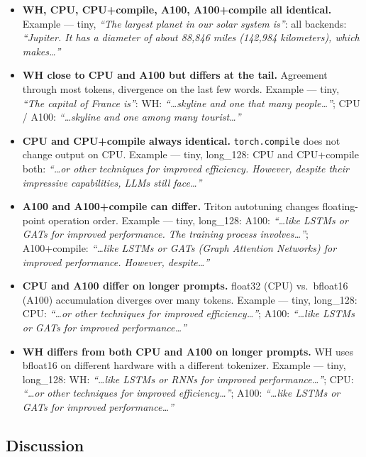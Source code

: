 \begin{itemize}
  \item \textbf{WH, CPU, CPU+compile, A100, A100+compile all identical.} Example — tiny, \textit{``The largest planet in our solar system is''}: all backends: \textit{``Jupiter. It has a diameter of about 88,846 miles (142,984 kilometers), which makes\ldots''}

  \item \textbf{WH close to CPU and A100 but differs at the tail.} Agreement through most tokens, divergence on the last few words. Example — tiny, \textit{``The capital of France is''}: WH: \textit{``\ldots skyline and one that many people\ldots''}; CPU / A100: \textit{``\ldots skyline and one among many tourist\ldots''}

  \item \textbf{CPU and CPU+compile always identical.} \texttt{torch.compile} does not change output on CPU. Example — tiny, long\_128: CPU and CPU+compile both: \textit{``\ldots or other techniques for improved efficiency. However, despite their impressive capabilities, LLMs still face\ldots''}

  \item \textbf{A100 and A100+compile can differ.} Triton autotuning changes floating-point operation order. Example — tiny, long\_128: A100: \textit{``\ldots like LSTMs or GATs for improved performance. The training process involves\ldots''}; A100+compile: \textit{``\ldots like LSTMs or GATs (Graph Attention Networks) for improved performance. However, despite\ldots''}

  \item \textbf{CPU and A100 differ on longer prompts.} float32 (CPU) vs.\ bfloat16 (A100) accumulation diverges over many tokens. Example — tiny, long\_128: CPU: \textit{``\ldots or other techniques for improved efficiency\ldots''}; A100: \textit{``\ldots like LSTMs or GATs for improved performance\ldots''}

  \item \textbf{WH differs from both CPU and A100 on longer prompts.} WH uses bfloat16 on different hardware with a different tokenizer. Example — tiny, long\_128: WH: \textit{``\ldots like LSTMs or RNNs for improved performance\ldots''}; CPU: \textit{``\ldots or other techniques for improved efficiency\ldots''}; A100: \textit{``\ldots like LSTMs or GATs for improved performance\ldots''}
\end{itemize}

\subsection{Discussion}

